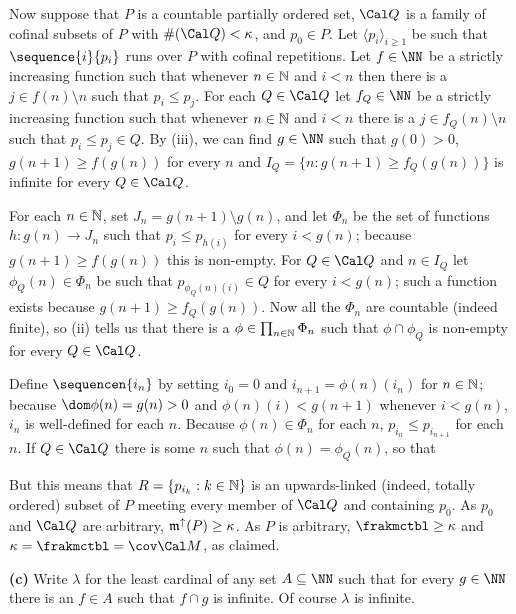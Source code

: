 {\medskip

 Now suppose that $P$ is a countable partially ordered
set, $\Cal Q$ is a family of cofinal subsets of $P$ with
$\#(\Cal Q)<\kappa$, and $p_0\in P$.   Let $\langle p_i\rangle_{i\ge 1}$
be such that $\sequence{i}{p_i}$ runs over $P$ with cofinal repetitions.
Let $f\in\NN$ be a  strictly increasing function such that whenever
$n\in\Bbb N$ and $i<n$ then there is a $j\in f(n)\setminus n$ such that
$p_i\le p_j$.   For each $Q\in\Cal Q$ let $f_Q\in\NN$ be a strictly
increasing function such that whenever $n\in\Bbb N$ and $i<n$ there is a
$j\in f_Q(n)\setminus n$ such that $p_i\le p_j\in Q$.
By (iii), we can find $g\in\NN$ such that $g(0)>0$,
$g(n+1)\ge f(g(n))$ for every $n$ and $I_Q=\{n:g(n+1)\ge f_Q(g(n))\}$ is
infinite for every $Q\in\Cal Q$.

For each $n\in\Bbb N$, set $J_n=g(n+1)\setminus g(n)$, and let $\Phi_n$
be the set of functions $h:g(n)\to J_n$ such that
$p_i\le p_{h(i)}$ for every $i<g(n)$;  because
$g(n+1)\ge f(g(n))$ this is non-empty.   For $Q\in\Cal Q$ and $n\in I_Q$
let $\phi_Q(n)\in\Phi_n$ be such that $p_{\phi_Q(n)(i)}\in Q$ for every
$i<g(n)$;  such a function exists because $g(n+1)\ge f_Q(g(n))$.   Now
all the $\Phi_n$ are countable (indeed finite), so (ii) tells us that
there is a $\phi\in\prod_{n\in\Bbb N}\Phi_n$ such that $\phi\cap\phi_Q$
is non-empty for every $Q\in\Cal Q$.

Define $\sequencen{i_n}$ by setting $i_0=0$ and $i_{n+1}=\phi(n)(i_n)$
for $n\in\Bbb N$;  because $\dom\phi(n)=g(n)>0$ and $\phi(n)(i)<g(n+1)$
whenever $i<g(n)$, $i_n$ is well-defined for each $n$.   Because
$\phi(n)\in\Phi_n$ for each $n$, $p_{i_n}\le p_{i_{n+1}}$ for each $n$.
If $Q\in\Cal Q$ there is some $n$ such that $\phi(n)=\phi_Q(n)$, so that


\noindent But this means that $R=\{p_{i_k}:k\in\Bbb N\}$ is an
upwards-linked (indeed, totally ordered) subset of $P$ meeting every
member of $\Cal Q$ and containing $p_0$.   As $p_0$ and $\Cal Q$ are
arbitrary, $\frak m^{\uparrow}(P)\ge\kappa$.   As $P$ is arbitrary,
$\frakmctbl\ge\kappa$ and $\kappa=\frakmctbl=\cov\Cal M$, as claimed.

\medskip

{\bf (c)} Write $\lambda$ for the least cardinal of any set
$A\subseteq\NN$ such that for every $g\in\NN$
there is an $f\in A$ such that $f\cap g$ is infinite.
Of course $\lambda$ is infinite.

}
